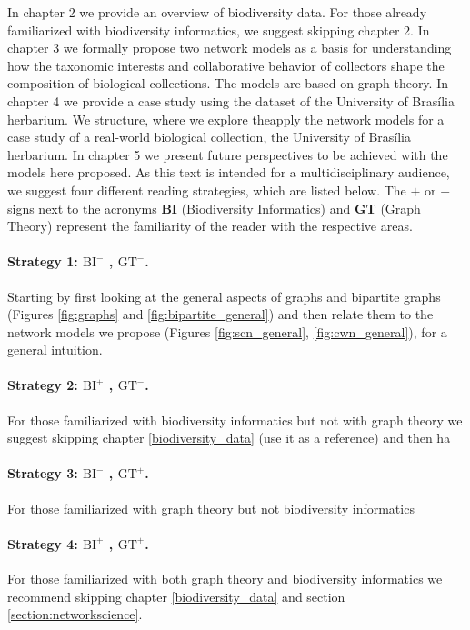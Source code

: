 In chapter 2 we provide an overview of biodiversity data.
For those already familiarized with biodiversity informatics, we suggest skipping chapter 2.
%
In chapter 3 we formally propose two network models as a basis for understanding how the taxonomic interests and collaborative behavior of collectors shape the composition of biological collections.
The models are based on graph theory.
%
In chapter 4 we provide a case study using the dataset of the University of Brasília herbarium.
We structure, where we explore theapply the network models for a case study of a real-world biological collection, the University of Brasília herbarium.
%
In chapter 5 we present future perspectives to be achieved with the models here proposed.
%
As this text is intended for a multidisciplinary audience, we suggest four different reading strategies, which are listed below.
The $+$ or $-$ signs next to the acronyms \textbf{BI} (Biodiversity Informatics) and \textbf{GT} (Graph Theory) represent the familiarity of the reader with the respective areas.

\paragraph*{Strategy 1: $\text{BI}^-$ , $\text{GT}^-$.} Starting by first looking at the general aspects of graphs and bipartite graphs (Figures \ref{fig:graphs} and \ref{fig:bipartite_general}) and then relate them to the network models we propose (Figures \ref{fig:scn_general}, \ref{fig:cwn_general}), for a general intuition.

\paragraph*{Strategy 2: $\text{BI}^+$ , $\text{GT}^-$.} For those familiarized with biodiversity informatics but not with graph theory we suggest skipping chapter \ref{biodiversity_data} (use it as a reference) and then ha

\paragraph*{Strategy 3: $\text{BI}^-$ , $\text{GT}^+$.} For those familiarized with graph theory but not biodiversity informatics

\paragraph*{Strategy 4: $\text{BI}^+$ , $\text{GT}^+$.} For those familiarized with both graph theory and biodiversity informatics we recommend skipping chapter \ref{biodiversity_data} and section \ref{section:networkscience}.







